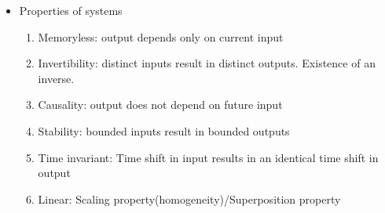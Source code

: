 \documentclass{article}
\begin{document}
\begin{itemize}
\item Properties of systems
\begin{enumerate}
\item Memoryless: output depends only on current input

\item Invertibility: distinct inputs result in distinct outputs. Existence of an inverse.

\item Causality: output does not depend on future input

\item Stability: bounded inputs result in bounded outputs

\item Time invariant: Time shift in input results in an identical time shift in output

\item Linear: Scaling property(homogeneity)/Superposition property
\end{enumerate}
\end{itemize}
\end{document}
